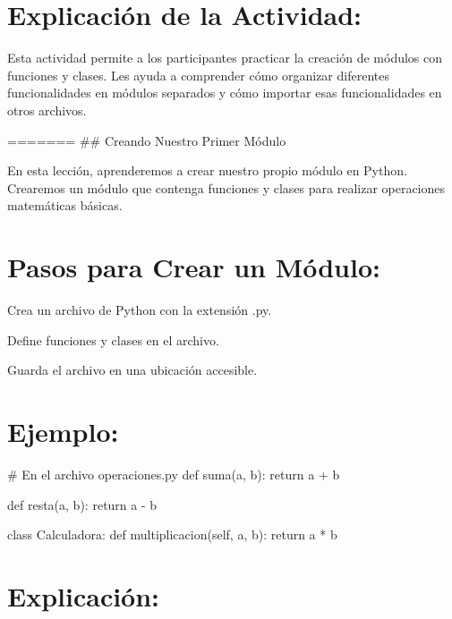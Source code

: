 \documentclass[
  a4paper,
  DIV=11,
  numbers=noendperiod,
  onepage,
  openany]{scrreprt}
\newenvironment{Shaded}{\begin{snugshade}}{\end{snugshade}}
\newcommand{\CommentTok}[1]{\textcolor[rgb]{0.37,0.37,0.37}{#1}}
\newcommand{\ControlFlowTok}[1]{\textcolor[rgb]{0.00,0.23,0.31}{#1}}
\newcommand{\KeywordTok}[1]{\textcolor[rgb]{0.00,0.23,0.31}{#1}}
\newcommand{\NormalTok}[1]{\textcolor[rgb]{0.00,0.23,0.31}{#1}}
\newcommand{\OperatorTok}[1]{\textcolor[rgb]{0.37,0.37,0.37}{#1}}
\newcommand{\VariableTok}[1]{\textcolor[rgb]{0.07,0.07,0.07}{#1}}
\begin{document}
\hypertarget{explicaciuxf3n-de-la-actividad-58}{%
\section{Explicación de la
Actividad:}\label{explicaciuxf3n-de-la-actividad-58}}

Esta actividad permite a los participantes practicar la creación de
módulos con funciones y clases. Les ayuda a comprender cómo organizar
diferentes funcionalidades en módulos separados y cómo importar esas
funcionalidades en otros archivos.

======= \#\# Creando Nuestro Primer Módulo

En esta lección, aprenderemos a crear nuestro propio módulo en Python.
Crearemos un módulo que contenga funciones y clases para realizar
operaciones matemáticas básicas.

\hypertarget{pasos-para-crear-un-muxf3dulo-1}{%
\section{Pasos para Crear un
Módulo:}\label{pasos-para-crear-un-muxf3dulo-1}}

Crea un archivo de Python con la extensión .py.

Define funciones y clases en el archivo.

Guarda el archivo en una ubicación accesible.

\hypertarget{ejemplo-61}{%
\section{Ejemplo:}\label{ejemplo-61}}

\begin{Shaded}
\begin{Highlighting}[]
\CommentTok{\# En el archivo operaciones.py}
\KeywordTok{def}\NormalTok{ suma(a, b):}
    \ControlFlowTok{return}\NormalTok{ a }\OperatorTok{+}\NormalTok{ b}

\KeywordTok{def}\NormalTok{ resta(a, b):}
    \ControlFlowTok{return}\NormalTok{ a }\OperatorTok{{-}}\NormalTok{ b}

\KeywordTok{class}\NormalTok{ Calculadora:}
    \KeywordTok{def}\NormalTok{ multiplicacion(}\VariableTok{self}\NormalTok{, a, b):}
        \ControlFlowTok{return}\NormalTok{ a }\OperatorTok{*}\NormalTok{ b}
\end{Highlighting}
\end{Shaded}

\hypertarget{explicaciuxf3n-61}{%
\section{Explicación:}\label{explicaciuxf3n-61}}
\end{document}
